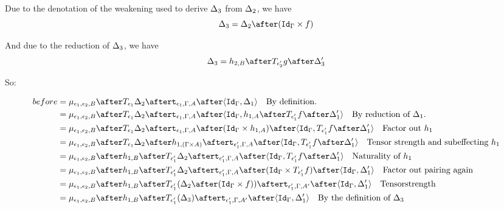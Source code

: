 \documentclass{report}
\begin{document}
            Due to the denotation of the weakening used to derive $\Delta_3$ from $\Delta_2$, we have 
            \begin{equation}
                \D_3 = \D_2\after(\idg\times f)
            \end{equation}

            And due to the reduction of $\Delta_3$,
            we have 
            \begin{equation}
                \D_3 = h_{2, B} \after \T{\e_2'}{g}\after \D_3'
            \end{equation}

            So:

            \begin{align*}
                before &= \bind{\e_1}{\e_2}{B}\after \T{\e_1}{\D_2}\after\tstrength{\e_1}{\G}{A}\after\pr{\idg}{\D_1}\qt{By definition.}\\
                &= \bind{\e_1}{\e_2}{B}\after \T{\e_1}{\D_2}\after\tstrength{\e_1}{\G}{A}\after\pr{\idg}{h_{1, A}\after\T{\e_1'}{f}\after\D_1'}\qt{By reduction of $\D_1$.}\\
                &= \bind{\e_1}{\e_2}{B}\after \T{\e_1}{\D_2}\after\tstrength{\e_1}{\G}{A}\after(\idg\times h_{1, A})\after\pr{\idg}{\T{\e_1'}{f}\after\D_1'}\qt{Factor out $h_1$}\\
                &= \bind{\e_1}{\e_2}{B}\after \T{\e_1}{\D_2}\after
                h_{1, (\G\times A)}\after
                \tstrength{\e_1'}{\G}{A}\after\pr{\idg}{\T{\e_1'}{f}\after\D_1'}\qt{Tensor strength and subeffecting $h_1$}\\
                &= \bind{\e_1}{\e_2}{B}\after 
                h_{1, B}\after\T{\e_1'}{\D_2}\after
                \tstrength{\e_1'}{\G}{A}\after\pr{\idg}{\T{\e_1'}{f}\after\D_1'}\qt{Naturality of $h_1$}\\
                &= \bind{\e_1}{\e_2}{B}\after 
                h_{1, B}\after\T{\e_1'}{\D_2}\after
                \tstrength{\e_1'}{\G}{A}\after(\idg\times \T{\e_1'}{f})\after\pr{\idg}{\D_1'}\qt{Factor out pairing again}\\
                &= \bind{\e_1}{\e_2}{B}\after 
                h_{1, B}\after\T{\e_1'}{(\D_2\after(\idg\times f))}\after
                \tstrength{\e_1'}{\G}{A'}\after\pr{\idg}{\D_1'}\qt{Tensorstrength}\\
                &= \bind{\e_1}{\e_2}{B}\after 
                h_{1, B}\after\T{\e_1'}{(\D_3)}\after
                \tstrength{\e_1'}{\G}{A'}\after\pr{\idg}{\D_1'}\qt{By the definition of $\D_3$}\\

\end{align*}
\end{document}
